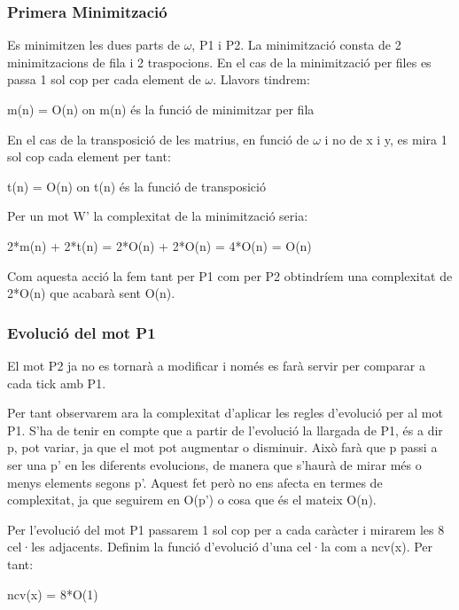 \documentclass[12pt,a4paper]{report}
\def \w{$\omega$}
\begin{document}
\subsubsection{Primera Minimització}

Es minimitzen les dues parts de \w{}, P1 i P2. La minimització consta de 2 minimitzacions de fila i 2 traspocions. En el cas de la minimització per files es passa 1 sol cop per cada element de \w{}. Llavors tindrem:

\begin{center}
m(n) = O(n)  on m(n) és la funció de minimitzar per fila
\end{center}

En el cas de la transposició de les matrius, en funció de \w{} i no de x i y, es mira 1 sol cop cada element per tant:

\begin{center}
t(n) = O(n) on t(n) és la funció de transposició
\end{center}

Per un mot W’ la complexitat de la minimització seria:

\begin{center}
2*m(n) + 2*t(n) = 2*O(n) + 2*O(n) = 4*O(n) = O(n)
\end{center}

Com aquesta acció la fem tant per P1 com per P2 obtindríem una complexitat de 2*O(n) que acabarà sent O(n).

\subsubsection{Evolució del mot P1}

El mot P2 ja no es tornarà a modificar i només es farà servir per comparar a cada tick  amb  P1. 

Per tant observarem ara la complexitat d’aplicar les regles d’evolució per al mot P1. S’ha de tenir en compte que a partir de l’evolució la llargada de P1, és a dir p, pot variar, ja que el mot pot augmentar o disminuir. Això farà que p passi a ser una p’ en les diferents evolucions, de manera que s'haurà de mirar més o menys elements segons p'. Aquest fet però no ens afecta en termes de complexitat, ja que seguirem en O(p') o cosa que és el mateix O(n).

Per l’evolució del mot P1 passarem 1 sol cop per a cada caràcter i mirarem les 8 cel·les adjacents. Definim la funció d’evolució d’una cel·la com a ncv(x). Per tant:

\begin{center}
ncv(x) = 8*O(1)
\end{center}
\end{document}
